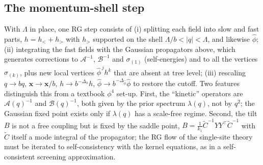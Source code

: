 \documentclass[11pt,a4paper]{article}
\newcommand{\Lam}{\Lambda}
\newcommand{\Ct}{\tilde C}
\begin{document}
\subsection{The momentum-shell step}
\label{sec:shell}
With $\Lam$ in place, one RG step consists of (i) splitting each field into slow and fast parts, $h = h_< + h_>$ with $h_>$ supported on the shell $\Lam/b<|q|<\Lam$, and likewise $\hat\phi$; (ii) integrating the fast fields with the Gaussian propagators above, which generates corrections to $\mathcal A^{-1}$, $\mathcal B^{-1}$ and $\sigma_{(1)}$ (self-energies) and to all the vertices $\sigma_{(k)}$, plus new local vertices $\hat\phi^{\,j}h^k$ that are absent at tree level; (iii) rescaling $q\to bq$, $\mathbf x\to\mathbf x/b$, $h\to b^{-\Delta_h}h$, $\hat\phi\to b^{-\Delta_{\hat\phi}}\hat\phi$ to restore the cutoff. Two features distinguish this from a textbook $\phi^4$ set-up. First, the ``kinetic'' operators are $\mathcal A(q)^{-1}$ and $\mathcal B(q)^{-1}$, both given by the prior spectrum $\lambda(q)$, not by $q^2$; the Gaussian fixed point exists only if $\lambda(q)$ has a scale-free regime. Second, the tilt $B$ is not a free coupling but is fixed by the saddle point, $B = \frac1{k_1}\Ct^{-1}YY^{\top}\Ct^{-1}$ with $\Ct$ itself a mode integral of the propagator; the RG flow of the single-site theory must be iterated to self-consistency with the kernel equations, as in a self-consistent screening approximation.
\end{document}
